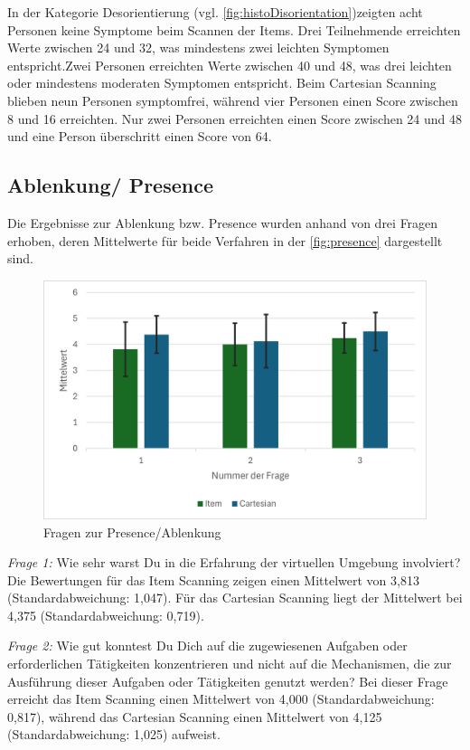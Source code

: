 In der Kategorie Desorientierung (vgl. \autoref{fig:histoDisorientation})zeigten acht Personen keine Symptome beim Scannen der Items. Drei Teilnehmende erreichten Werte zwischen 24 und 32, was mindestens zwei leichten Symptomen entspricht.Zwei Personen erreichten Werte zwischen 40 und 48, was drei leichten oder mindestens moderaten Symptomen entspricht. Beim Cartesian Scanning blieben neun Personen symptomfrei, während vier Personen einen Score zwischen 8 und 16 erreichten. Nur zwei Personen erreichten einen Score zwischen 24 und 48 und eine Person überschritt einen Score von 64. 

\subsection{Ablenkung/ Presence}

Die Ergebnisse zur Ablenkung bzw. Presence wurden anhand von drei Fragen erhoben, deren Mittelwerte für beide Verfahren in der \autoref{fig:presence} dargestellt sind.

\begin{figure}[tbh]
 \centering
\includegraphics{images/Results/Fragen-zur-Presence-Ablenkung.png}
 \caption{Fragen zur Presence/Ablenkung}
 \label{fig:presence}
\end{figure}

\textit{Frage 1:} Wie sehr warst Du in die Erfahrung der virtuellen Umgebung involviert?
Die Bewertungen für das Item Scanning zeigen einen Mittelwert von 3,813 (Standardabweichung: 1,047). Für das Cartesian Scanning liegt der Mittelwert bei 4,375 (Standardabweichung: 0,719).

\textit{Frage 2:} Wie gut konntest Du Dich auf die zugewiesenen Aufgaben oder erforderlichen Tätigkeiten konzentrieren und nicht auf die Mechanismen, die zur Ausführung dieser Aufgaben oder Tätigkeiten genutzt werden?
Bei dieser Frage erreicht das Item Scanning einen Mittelwert von 4,000 (Standardabweichung: 0,817), während das Cartesian Scanning einen Mittelwert von 4,125 (Standardabweichung: 1,025) aufweist.

